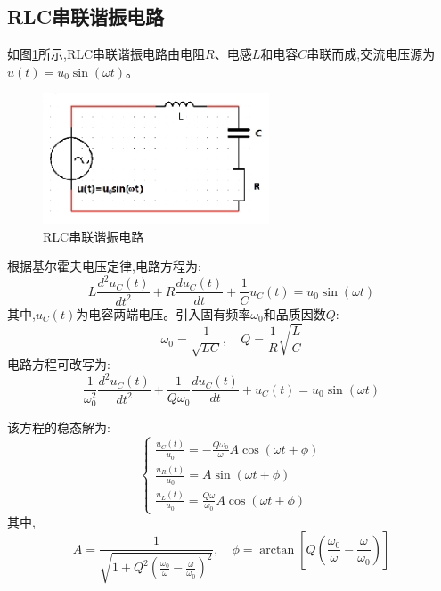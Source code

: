\documentclass[UTF8]{ctexart}
\begin{document}
\subsection{RLC串联谐振电路}

如图\ref{fig:rlc_circuit}所示,RLC串联谐振电路由电阻$R$、电感$L$和电容$C$串联而成,交流电压源为$u(t)=u_0\sin(\omega t)$。
\begin{figure}[htbp]
\centering
\includegraphics[width=0.6\textwidth]{rlc_circuit.png}
\caption{RLC串联谐振电路}\label{fig:rlc_circuit}
\end{figure}

根据基尔霍夫电压定律,电路方程为:
\begin{equation}
L\frac{d^2u_C(t)}{dt^2} + R\frac{du_C(t)}{dt} + \frac{1}{C}u_C(t) = u_0\sin(\omega t)
\end{equation}
其中,$u_C(t)$为电容两端电压。引入固有频率$\omega_0$和品质因数$Q$:
\begin{equation}
\omega_0 = \frac{1}{\sqrt{LC}}, \quad Q = \frac{1}{R}\sqrt{\frac{L}{C}}
\end{equation}
电路方程可改写为:
\begin{equation}
\frac{1}{\omega_0^2}\frac{d^2u_C(t)}{dt^2} + \frac{1}{Q\omega_0}\frac{du_C(t)}{dt} + u_C(t) = u_0\sin(\omega t)
\end{equation}

该方程的稳态解为:
\begin{equation}
\begin{cases}
\frac{u_C(t)}{u_0} = -\frac{Q\omega_0}{\omega}A\cos(\omega t + \phi) \\
\frac{u_R(t)}{u_0} = A\sin(\omega t + \phi) \\
\frac{u_L(t)}{u_0} = \frac{Q\omega}{\omega_0}A\cos(\omega t + \phi)
\end{cases}
\end{equation}
其中,
\begin{equation}
A = \frac{1}{\sqrt{1 + Q^2(\frac{\omega_0}{\omega} - \frac{\omega}{\omega_0})^2}}, \quad
\phi = \arctan\left[Q\left(\frac{\omega_0}{\omega} - \frac{\omega}{\omega_0}\right)\right]
\end{equation}
\end{document}
